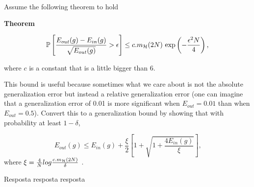 \begin{enunciado}{21}
    Assume the following theorem to hold 
    
   \textbf{Theorem} 
    
   $$ \mathbb{P}\left[ \dfrac{E_{out}(g) - E_{in}(g)}{\sqrt{E_{out}(g)}} > \epsilon \right] \leq c . m_{\mathcal{H}}(2N) \mbox{ exp} \left(- \dfrac{\epsilon^{2}N}{4} \right) \mbox{,}$$

where $c$ is a constant that is a little bigger than 6.

This bound is useful because sometimes what we care about is not the absolute generalization error but instead a relative generalization error (one can imagine that a generalization error of 0.01 is more significant when $E_{out} = 0.01$ than when $E_{out} = 0.5$). Convert this to a generalization bound by showing that with probability at least $1 - \delta$,

$$ E_{out}(g) \leq E_{in} (g) + \dfrac{\xi}{2}\left[ 1 + \sqrt{1 + \dfrac{4E_{in}(g)}{\xi}} \right] \mbox{,}$$
where $\xi = \frac{4}{N} log \frac{c.m_{\mathcal{H}}(2N)}{\delta}$ .
  
 
\end{enunciado}

Resposta resposta resposta